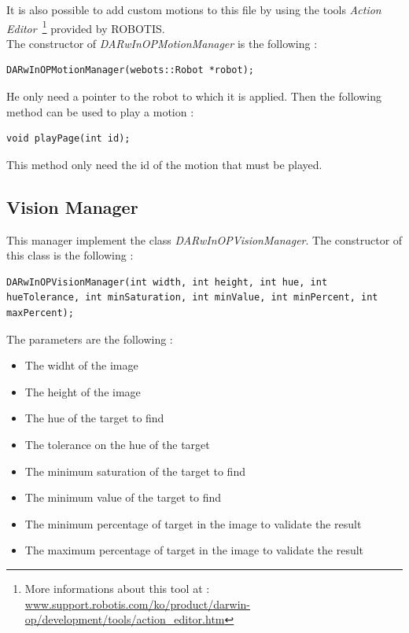 \documentclass[a4paper, 12pt]{article}  		%
\begin{document}
It is also possible to add custom motions to this file by using the tools \textit{Action Editor} \,\footnote{ More informations about this tool at : \url{www.support.robotis.com/ko/product/darwin-op/development/tools/action_editor.htm}} provided by ROBOTIS.\\

The constructor of \textit{DARwInOPMotionManager} is the following :\\
\lstset{language=c++} 
\lstset{commentstyle=\textit} 
\begin{lstlisting} 
DARwInOPMotionManager(webots::Robot *robot);
\end{lstlisting}

He only need a pointer to the robot to which it is applied. Then the following method can be used to play a motion :\\

\lstset{language=c++} 
\lstset{commentstyle=\textit} 
\begin{lstlisting} 
void playPage(int id);
\end{lstlisting}

This method only need the id of the motion that must be played.\\

\newpage
\subsection{Vision Manager}
This manager implement the class \textit{DARwInOPVisionManager}. The constructor of this class is the following :\\

\lstset{language=c++} 
\lstset{commentstyle=\textit} 
\begin{lstlisting} 
DARwInOPVisionManager(int width, int height, int hue, int hueTolerance, int minSaturation, int minValue, int minPercent, int maxPercent);
\end{lstlisting}
The parameters are the following : \\
\begin{itemize}
\item The widht of the image
\item The height of the image
\item The hue of the target to find
\item The tolerance on the hue of the target
\item The minimum saturation of the target to find
\item The minimum value of the target to find
\item The minimum percentage of target in the image to validate the result
\item The maximum percentage of target in the image to validate the result
\end{itemize}
\end{document}
